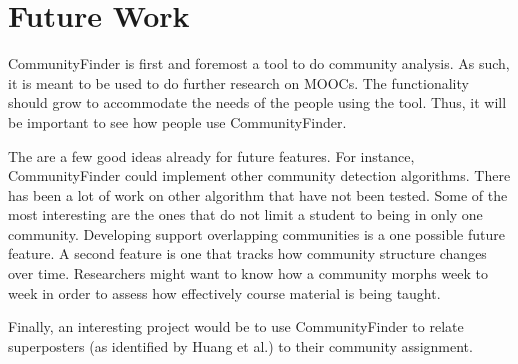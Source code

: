 \section{Future Work}

CommunityFinder is first and foremost a tool to do community analysis. As such, it is meant to be used to do further research on MOOCs. The functionality should grow to accommodate the needs of the people using the tool. Thus, it will be important to see how people use CommunityFinder.

The are a few good ideas already for future features. For instance, CommunityFinder could implement other community detection algorithms. There has been a lot of work on other algorithm that have not been tested. Some of the most interesting are the ones that do not limit a student to being in only one community. Developing support overlapping communities is a one possible future feature. A second feature is one that tracks how community structure changes over time. Researchers might want to know how a community morphs week to week in order to assess how effectively course material is being taught.

Finally, an interesting project would be to use CommunityFinder to relate superposters (as identified by Huang et al.) to their community assignment.
